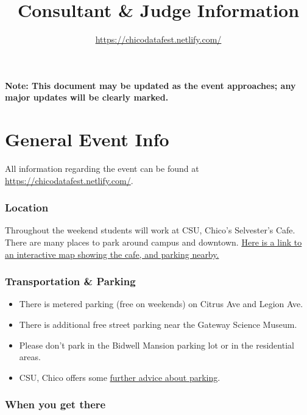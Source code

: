 \documentclass[]{article}
\title{Consultant \& Judge Information}
\subtitle{\url{https://chicodatafest.netlify.com/}}
\author{}
\date{}
\providecommand{\tightlist}{%
  \setlength{\itemsep}{0pt}\setlength{\parskip}{0pt}}
\begin{document}
\maketitle

\textbf{Note: This document may be updated as the event approaches; any
major updates will be clearly marked.}

\hypertarget{general-event-info}{%
\section{General Event Info}\label{general-event-info}}

All information regarding the event can be found at
\url{https://chicodatafest.netlify.com/}.

\hypertarget{location}{%
\subsubsection{Location}\label{location}}

Throughout the weekend students will work at CSU, Chico's Selvester's
Cafe. There are many places to park around campus and downtown.
\href{https://www.csuchico.edu/maps/campus/?id=1193\#!m/316229?ce/0,31642,28505?ct/28506,36245,36247,36246,36473,36472,32703,32116,32115,32092,32068,32015,31198?mc/39.730033800326076,-121.84518098831178?z/17?lvl/0}{Here
is a link to an interactive map showing the cafe, and parking nearby.}

\hypertarget{transportation-parking}{%
\subsubsection{Transportation \& Parking}\label{transportation-parking}}

\begin{itemize}
\tightlist
\item
  There is metered parking (free on weekends) on Citrus Ave and Legion
  Ave.
\item
  There is additional free street parking near the Gateway Science
  Museum.
\item
  Please don't park in the Bidwell Mansion parking lot or in the
  residential areas.
\item
  CSU, Chico offers some
  \href{https://www.csuchico.edu/parking/wheretopark.shtml}{further
  advice about parking}.
\end{itemize}

\hypertarget{when-you-get-there}{%
\subsubsection{When you get there}\label{when-you-get-there}}
\end{document}
